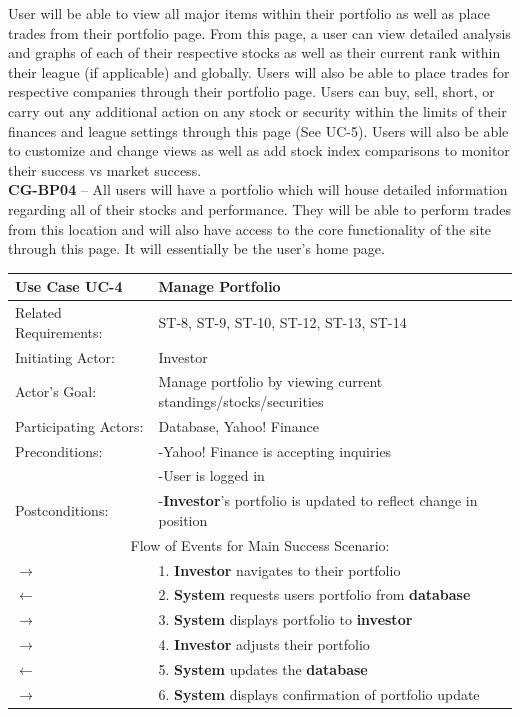 User will be able to view all major items within their portfolio as well as place trades from
their portfolio page. From this page, a user can view detailed analysis and graphs of each
of their respective stocks as well as their current rank within their league (if applicable)
and globally. Users will also be able to place trades for respective companies through their
portfolio page. Users can buy, sell, short, or carry out any additional action on any stock
or security within the limits of their finances and league settings through this page (See UC-5).
Users will also be able to customize and change views as well as add stock index comparisons
to monitor their success vs market success.\\

\textbf{CG-BP04} – All users will have a portfolio which will house detailed information
regarding all of their stocks and performance. They will be able to perform trades
from this location and will also have access to the core functionality of the site
through this page. It will essentially be the user’s home page. \\

\begin{centering}
\label{UC-4}
\renewcommand\arraystretch{1.3}
\begin{longtable}{|p{1.2in} p{5in}|}
\hline
\bfseries{\color{color1}Use Case UC-4} &
\bfseries{\color{color1}Manage Portfolio} \\
\hline
Related Requirements: & ST-8, ST-9, ST-10, ST-12, ST-13, ST-14 \\
Initiating Actor:     & Investor \\
Actor's Goal:         & Manage portfolio by viewing current standings/stocks/securities \\
Participating Actors: & Database, Yahoo! Finance \\
Preconditions:        & -Yahoo! Finance is accepting inquiries \\
                      & -User is logged in \\
Postconditions:       & -\textbf{Investor}'s portfolio is updated to reflect change
                        in position \\
\hline
\multicolumn{2}{|c|}{\color{color1}Flow of Events for Main Success Scenario:}\\
\hline

$\rightarrow$ & 1. \textbf{Investor} navigates to their portfolio \\
 $\leftarrow$ & 2. \textbf{System} requests users portfolio from \textbf{database}\\
$\rightarrow$ & 3. \textbf{System} displays portfolio to \textbf{investor} \\
$\rightarrow$ & 4. \textbf{Investor} adjusts their portfolio \\
 $\leftarrow$ & 5. \textbf{System} updates the \textbf{database} \\
 $\rightarrow$ & 6. \textbf{System} displays confirmation of portfolio update \\
\hline

\end{longtable}
\end{centering}

